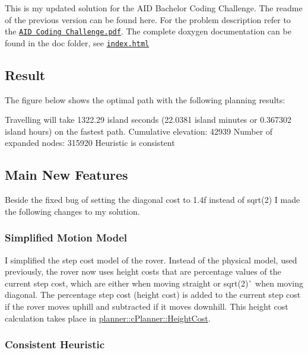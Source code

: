 This is my updated solution for the A\+ID Bachelor Coding Challenge. The readme of the previous version can be found here. For the problem description refer to the \href{AID_Coding_Challenge.pdf}{\tt A\+ID Coding Challenge.\+pdf}. The complete doxygen documentation can be found in the doc folder, see \href{doc/html/index.html}{\tt index.\+html}

\subsection*{Result}

The figure below shows the optimal path with the following planning results\+:


\begin{DoxyCode}
Travelling will take 1322.29 island seconds (22.0381 island minutes or 0.367302 island hours) on the
       fastest path. 
Cumulative elevation: 42939
Number of expanded nodes: 315920
Heuristic is consistent
\end{DoxyCode}




\subsection*{Main New Features}

Beside the fixed bug of setting the diagonal cost to 1.\+4f instead of sqrt(2) I made the following changes to my solution.

\subsubsection*{Simplified Motion Model}

I simplified the step cost model of the rover. Instead of the physical model, used previously, the rover now uses height costs that are percentage values of the current step cost, which are either {} when moving straight or sqrt(2)\`{} when moving diagonal. The percentage step cost (height cost) is added to the current step cost if the rover moves uphill and subtracted if it moves downhill. This height cost calculation takes place in \mbox{\hyperlink{classplanner_1_1c_planner_a9d57a0697bb0e4666f4fd45f77c4a1aa}{planner\+::c\+Planner\+::\+Height\+Cost}}.

\subsubsection*{Consistent Heuristic}

